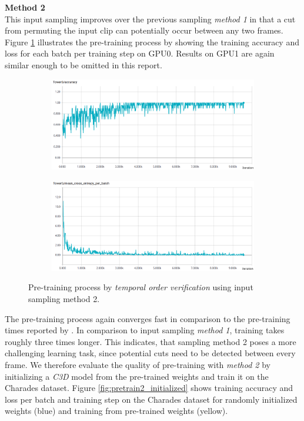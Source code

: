\textbf{Method 2}\\
This input sampling improves over the previous sampling \textit{method 1} in that a cut from permuting the input clip can potentially occur between any two frames.
Figure \ref{fig:pretrain2} illustrates the pre-training process by showing the training accuracy and loss for each batch per training step on GPU0.
Results on GPU1 are again similar enough to be omitted in this report.

\begin{figure}[H]
    \begin{subfigure}[c]{\textwidth}
    \centering
    \includegraphics[width=\textwidth]{img_evaluation/pretrain2/tower0accuracy}
    \end{subfigure}
    \begin{subfigure}[c]{\textwidth}
    \includegraphics[width=\textwidth]{img_evaluation/pretrain2/tower0crossentropy}
    \end{subfigure}
    \caption{Pre-training process by \textit{temporal order verification} using input sampling method 2.}
\label{fig:pretrain2}
\end{figure}

The pre-training process again converges fast in comparison to the pre-training times reported by \textcite{misra_shuffle_2016}.
In comparison to input sampling \textit{method 1}, training takes roughly three times longer.
This indicates, that sampling method 2 poses a more challenging learning task, since potential cuts need to be detected between every frame.
We therefore evaluate the quality of pre-training with \textit{method 2} by initializing a \textit{C3D} model from the pre-trained weights and train it on the Charades dataset.
Figure \ref{fig:pretrain2_initialized} shows training accuracy and loss per batch and training step on the Charades dataset for randomly initialized weights (blue) and training from pre-trained weights (yellow).

